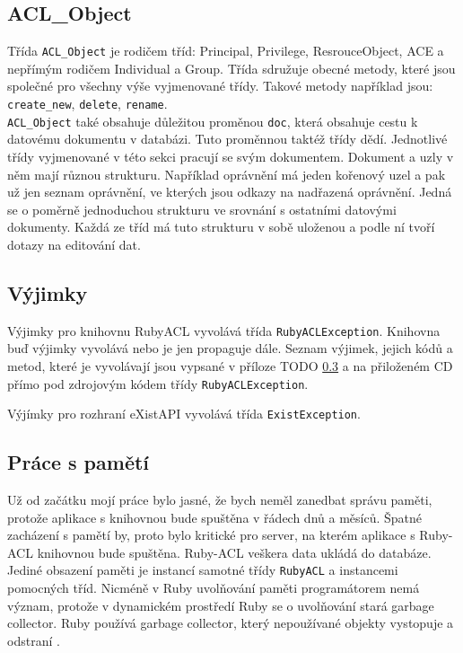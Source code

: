 
\subsection{ACL\_Object}
Třída \verb|ACL_Object| je rodičem tříd: Principal, Privilege, ResrouceObject, ACE a nepřímým rodičem Individual a Group.
Třída sdružuje obecné metody, které jsou společné pro všechny výše vyjmenované třídy. Takové metody například jsou: \verb|create_new|, \verb|delete|, \verb|rename|. \\ \verb|ACL_Object| také obsahuje důležitou proměnou \verb|doc|, která obsahuje cestu k datovému dokumentu v databázi. Tuto proměnnou taktéž třídy dědí.
Jednotlivé třídy vyjmenované v této sekci pracují se svým dokumentem. Dokument a uzly v něm mají různou strukturu. Například oprávnění má jeden kořenový uzel a pak už jen seznam oprávnění, ve kterých jsou odkazy na nadřazená oprávnění. Jedná se o poměrně jednoduchou strukturu ve srovnání s ostatními datovými dokumenty. Každá ze tříd má tuto strukturu v sobě uloženou a podle ní tvoří dotazy na editování dat.


\subsection{Výjimky}
Výjimky pro knihovnu RubyACL vyvolává třída \verb|RubyACLException|. Knihovna buď výjimky vyvolává nebo je jen propaguje dále. Seznam výjimek, jejich kódů a metod, které je vyvolávají jsou vypsané v příloze TODO \ref{} a na přiloženém CD přímo pod zdrojovým kódem třídy \verb|RubyACLException|.

\noindent Výjímky pro rozhraní eXistAPI vyvolává třída \verb|ExistException|.


\subsection{Práce s pamětí}
Už od začátku mojí práce bylo jasné, že bych neměl zanedbat správu paměti, protože aplikace s knihovnou bude spuštěna v řádech dnů a měsíců. Špatné zacházení s pamětí by, proto bylo kritické pro server, na kterém aplikace s Ruby-ACL knihovnou bude spuštěna. Ruby-ACL veškera data ukládá do databáze. Jediné obsazení paměti je instancí samotné třídy \verb|RubyACL| a instancemi pomocných tříd. Nicméně v Ruby uvolňování paměti programátorem nemá význam, protože v dynamickém prostředí Ruby se o uvolňování stará garbage collector. Ruby používá garbage collector, který nepoužívané objekty vystopuje a odstraní \cite{Ruby}.